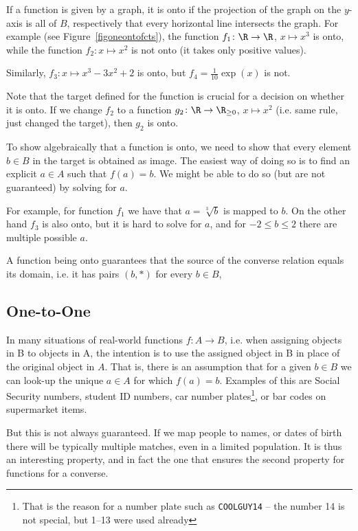 If a function is given by a graph, it is onto if the projection of the graph
on the $y$-axis is all of $B$, respectively that every horizontal line intersects the
graph.
For example (see Figure~\ref{figoneontofcts}), the function $f_1\colon\R\to\R$, $x\mapsto x^3$ is onto, while
the function $f_2\colon x\mapsto x^2$ is not onto (it takes only positive
values).

Similarly, $f_3\colon x\mapsto x^3-3x^2+2$ is
onto, but $f_4=\frac{1}{10}\exp(x)$ is not.

Note that the target defined for the function is crucial for a decision on
whether it is onto. If we change $f_2$ to a function $g_2\colon\R\to\R_{\ge
0}$, $x\mapsto x^2$ (i.e. same rule, just changed the target), then $g_2$ is
onto.
\medskip

To show algebraically that a function is onto, we need to show that every
element $b\in B$ in the target is obtained as image. The easiest way of
doing so is to find an explicit $a\in A$ such that $f(a)=b$. We might be
able to do so (but are not guaranteed) by solving for $a$.

For example, for function $f_1$ we have that $a=\sqrt[3]{b}$ is mapped to
$b$. On the other hand $f_3$ is also onto, but it is hard to solve for $a$,
and for $-2\le b\le 2$ there are multiple possible $a$.
\smallskip

A function being onto guarantees that the source of the converse relation
equals its domain, i.e. it has pairs
$(b,*)$ for every $b\in B$, 

\subsection{One-to-One}

In many situations of real-world functions $f\colon A\to B$, i.e. when
assigning objects in B to objects in A, the
intention is to use the assigned object in B in place of the original object in $A$.
That is, there is an assumption that for a given $b\in B$ we can look-up the unique
$a\in A$ for which $f(a)=b$. Examples of this are Social Security numbers, student ID
numbers, car number plates\footnote{That is the reason for a number plate such as
\texttt{COOLGUY14} -- the number 14 is not special, but 1--13 were used already},
or bar codes on supermarket items.

But this is not always guaranteed. If we map people to names, or dates of birth there
will be typically multiple matches, even in a limited population. It is thus an
interesting property, and in fact the one that ensures the second property for functions
for a converse.

